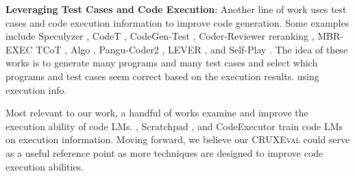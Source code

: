 \documentclass[twoside,11pt,preprint]{article}
\newcommand{\benchmark}{\textsc{CRUXEval}\xspace}
\newcommand{\benchmarki}{\textsc{CRUXEval-I}\xspace}
\newcommand{\benchmarko}{\textsc{CRUXEval-O}\xspace}
\begin{document}

\textbf{Leveraging Test Cases and Code Execution}: Another line of work uses test cases and code execution information to improve code generation. Some examples include Speculyzer \citep{key2022speak}, CodeT \citep{chen2022codet}, CodeGen-Test \citep{zhong2022codegen}, Coder-Reviewer reranking \citep{zhang2023coder}, MBR-EXEC \citep{shi2022natural}
TCoT \citep{tian2023test},
Algo \citep{zhang2023algo}, Pangu-Coder2 \citep{shen2023pangu}, LEVER \cite{ni2023lever}, and Self-Play \citep{haluptzok2022language}.
The idea of these works is to generate many programs and many test cases and select which programs and test cases seem correct based on the execution results. 
using execution info. 

Most relevant to our work, a handful of works examine and improve the execution ability of code LMs. \cite{austin2021program}, 
Scratchpad \citep{nye2021show}, and CodeExecutor \citep{liu2023code} train code LMs on execution information. Moving forward, we believe our \benchmark could serve as a useful reference point as more techniques are designed to improve code execution abilities.

\end{document}
